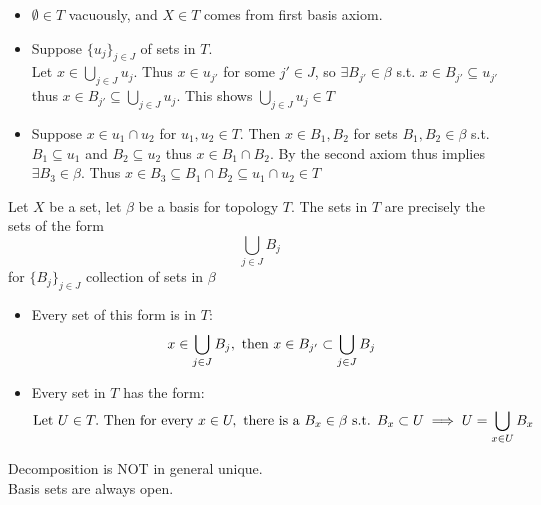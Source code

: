 \begin{proppf}
    \begin{itemize}
        \item $\emptyset \in T$ vacuously, and $X \in T$ comes from first basis axiom.
        \item Suppose $\{u_j\}_{j\in J}$ of sets in $T$.\\
        Let $x \in \bigcup_{j \in J} u_j$. Thus $x\in u_{j'}$ for some $j' \in J$, so $\exists B_{j'} \in \beta$ s.t. $x \in B_{j'} \subseteq u_{j'}$
        thus $x \in B_{j'} \subseteq \bigcup_{j \in J} u_j$. This shows $\bigcup_{j \in J} u_j \in T$
        \item Suppose $x \in u_1 \cap u_2$ for $u_1,u_2 \in T$. Then $x \in B_1,B_2$ for sets $B_1,B_2 \in \beta$ s.t. $B_1 \subseteq u_1$ and $B_2 \subseteq u_2$ thus $x \in B_1 \cap B_2$. By the second axiom thus implies
        $\exists B_3 \in \beta$. Thus $x \in B_3 \subseteq B_1 \cap B_2 \subseteq u_1 \cap u_2 \in T$
    \end{itemize}
\end{proppf}

\begin{proposition}{}{}
    Let $X$ be a set, let $\beta$ be a basis for topology $T$. The sets in $T$ are precisely the sets of the form
    \[\bigcup_{j \in J} B_j\] for $\{B_j\}_{j \in J}$ collection of sets in $\beta$
\end{proposition}
\begin{proppf}
    \begin{itemize}
        \item Every set of this form is in $T$:
        \[x \in \bigcup_{j \in J}B_j, \text{ then } x\in B_{j'} \subset \bigcup_{j \in J} B_j\]
        \item Every set in $T$ has the form:
        \[\text{Let } U \in T. \text{ Then for every } x \in U, \text{ there is a } B_x \in \beta \text{ s.t. } B_x \subset U \implies U=\bigcup_{x \in U} B_x\]
    \end{itemize}
\end{proppf}
\noindent Decomposition is NOT in general unique.\\
Basis sets are always open.\\
